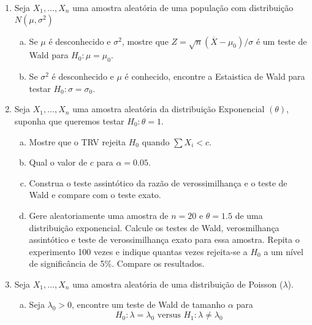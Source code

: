 \documentclass[10pt,brazil,addpoints]{exam}
\begin{document}
\begin{enumerate}[1.]


\item Seja $X_1, \ldots, X_n$ uma amostra aleatória de uma população com distribuição $N(\mu, \sigma^2)$

\begin{enumerate}[a)]

\item Se $\mu$ é desconhecido e $\sigma^2$, mostre que $Z=\sqrt{n}(\overline{X}-\mu_0)/\sigma$ é um teste de Wald para $H_0:\mu=\mu_0$.

\item Se $\sigma^2$ é desconhecido e $\mu$ é conhecido, encontre a Estaistica de Wald para testar $H_0:\sigma=\sigma_0$.


\end{enumerate}

\item Seja $X_1, \ldots, X_n$ uma amostra aleatória da distribuição Exponencial $(\theta)$, suponha que queremos testar $H_0:\theta=1$.

\begin{enumerate}[a)]

\item Mostre que o TRV rejeita $H_0$ quando $\sum X_i<c$. 

\item Qual o valor de $c$ para $\alpha=0.05$.

\item Construa o teste assintótico da razão de verossimilhança e o teste de Wald e compare com o teste exato.

\item Gere aleatoriamente uma amostra de $n=20$ e $\theta=1.5$ de uma distribuição exponencial. Calcule os testes de Wald, verosmilhança assintótico e teste de verossimilhança exato para essa amostra. Repita o experimento 100 vezes e indique quantas vezes rejeita-se a $H_0$ a um nível de significância de 5\%. Compare os resultados.

\end{enumerate}


\item Seja $X_1, \ldots, X_n$ uma amostra aleatória de uma distribuição de Poisson ($\lambda$).
\begin{enumerate}[a)]


\item Seja $\lambda_0>0$, encontre um teste de Wald de tamanho $\alpha$ para
$$
H_0: \lambda=\lambda_0  \mbox{ versus } H_1: \lambda \neq \lambda_0
$$


\end{enumerate}
\end{enumerate}
\end{document}
